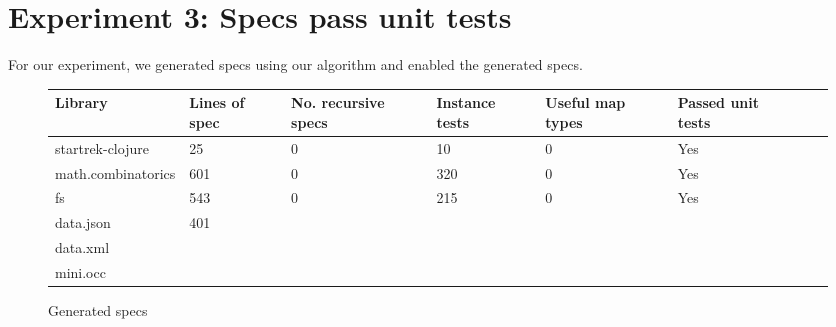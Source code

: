 \section{Experiment 3: Specs pass unit tests}

For our experiment, we generated specs using our algorithm and enabled
the generated specs.



\begin{figure}
\begin{tabular}{| l | l | l | l | l | l | l | l |}
  Library            & Lines of spec & No. recursive specs & Instance tests & Useful map types & Passed unit tests \\
  \hline
  startrek-clojure   & 25            & 0                   & 10             & 0                & Yes\\
  math.combinatorics & 601           & 0                   & 320            & 0                & Yes\\
  fs                 & 543           & 0                   & 215            & 0                & Yes \\
  data.json          & 401 \\
  data.xml           & \\
  mini.occ           & \\
\end{tabular}
\caption{Generated specs}
\end{figure}




% 
% 
%
% 
